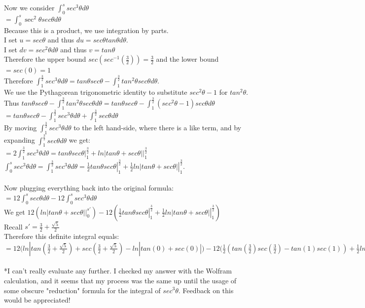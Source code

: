 \documentclass[11pt, oneside]{article}   	%
\begin{document}
\noindent Now we consider $\int_0^s sec^3\theta d\theta$\\
$= \int_0^s \sec^2\theta sec\theta d\theta$\\
Because this is a product, we use integration by parts.\\
I set $u = sec\theta$ and thus $du = sec\theta tan\theta d\theta$.\\
I set $dv = sec^2\theta d\theta$ and thus $v = tan\theta$\\
Therefore the upper bound $sec(sec^{-1}(\frac{3}{2})) = \frac{3}{2}$ and the lower bound $=sec(0) = 1$\\

\noindent Therefore $\int_1^\frac{3}{2} sec^3\theta d\theta = tan\theta sec\theta - \int_1^{\frac{3}{2}} tan^2\theta sec\theta d\theta$.\\
We use the Pythagorean trigonometric identity to substitute $sec^2\theta - 1$ for $tan^2\theta$.\\
Thus $tan\theta sec\theta - \int_1^{\frac{3}{2}} tan^2\theta sec\theta d\theta = tan\theta sec\theta - \int_1^{\frac{3}{2}} (sec^2\theta - 1) sec\theta d\theta$\\
$= tan\theta sec\theta - \int_1^{\frac{3}{2}} sec^3\theta d\theta + \int_1^{\frac{3}{2}}sec \theta d\theta$\\
By moving $\int_1^{\frac{3}{2}} sec^3\theta d\theta$ to the left hand-side, where there is a like term, and by expanding $ \int_1^{\frac{3}{2}} sec \theta d\theta$ we get:\\
$= 2 \int_1^{\frac{3}{2}} sec^3\theta d\theta = \left. tan\theta sec\theta \right|_1^{\frac{3}{2}}+ \left. ln|tan\theta + sec\theta| \right|_1^{\frac{3}{2}}$\\
$\int_0^s sec^3\theta d\theta = \int_1^{\frac{3}{2}} sec^3\theta d\theta = \left. \frac{1}{2} tan\theta sec\theta \right|_1^{\frac{3}{2}}+  \left. \frac{1}{2} ln|tan\theta + sec\theta| \right|_1^{\frac{3}{2}}$.\\~\\

\noindent Now plugging everything back into the original formula: $=12 \int_0^s sec\theta d\theta - 12 \int_0^s sec^3\theta d\theta$\\
We get $12(\left. ln|tan\theta + sec\theta| \right|_0^{s'}) - 12(\left. \frac{1}{2} tan\theta sec\theta \right|_1^{\frac{3}{2}}+  \left. \frac{1}{2} ln|tan\theta + sec\theta| \right|_1^{\frac{3}{2}})$\\
Recall $s' = \frac{3}{2} + \frac{\sqrt{5}}{2}$\\
Therefore this definite integral equals: \\
$= 12(ln|tan(\frac{3}{2} + \frac{\sqrt5}{2}) + sec(\frac{3}{2} + \frac{\sqrt 5}{2}) - ln|tan(0)+sec(0)|) - 12(\frac{1}{2}(tan(\frac{3}{2})sec(\frac{3}{2}) - tan(1)sec(1)) + \frac{1}{2}ln| tan(\frac{3}{2}) + sec(\frac{3}{2})| - \frac{1}{2}ln|tan(1)sec(1)|$\\~\\

\noindent**I can't really evaluate any further. I checked my answer with the Wolfram calculation, and it seems that my process was the same up until the usage of some obscure "reduction" formula for the integral of $sec^3\theta$. Feedback on this would be appreciated!
\end{document}
